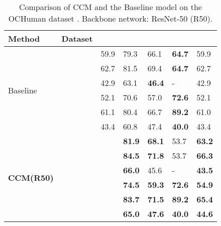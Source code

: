 \documentclass[twocolumn]{svjour3}          \smartqed  \usepackage{natbib}
\begin{document}
\begin{table}[htbp]
\centering
  \caption{Comparison of CCM and the Baseline model on the OCHuman dataset \citep{zhang2019pose}. Backbone network: ResNet-50 (R50).}
\begin{tabular}{p{1.2cm}p{1.3cm}p{1cm}<{\centering}p{0.6cm}<{\centering}p{0.6cm}<{\centering}p{0.5cm}<{\centering}p{0.5cm}<{\centering}}
    \toprule
    Method    & Dataset &     &   &   &    &  \\
    \midrule
    \multirow{6}[0]{*}{Baseline} &    & 59.9  & 79.3  & 66.1  & \textbf{64.7}  & 59.9 \\
          &  & 62.7  & 81.5  & 69.4  & \textbf{64.7}  & 62.7 \\
          &  & 42.9  & 63.1  & \textbf{46.4}  & -     & 42.9 \\
          \cmidrule{2-7}
          &   & 52.1  & 70.6  & 57.0    & \textbf{72.6}  & 52.1 \\
          &  & 61.1  & 80.4  & 66.7  & \textbf{89.2}  & 61.0 \\
          &  & 43.4  & 60.8  & 47.4  & \textbf{40.0}    & 43.4 \\
    \midrule
    \midrule
    \multirow{6}[0]{*}{\textbf{CCM(R50)}} &    &   & \textbf{81.9}  & \textbf{68.1}  & 53.7  & \textbf{63.2} \\
          &  &   & \textbf{84.5}  & \textbf{71.8}  & 53.7  & \textbf{66.3} \\
          &  &   & \textbf{66.0}    & 45.6  & -     & \textbf{43.5} \\
          \cmidrule{2-7}
          &   &   & \textbf{74.5}  & \textbf{59.3}  & \textbf{72.6}  & \textbf{54.9} \\
          &  &   & \textbf{83.7}  & \textbf{71.5}  & \textbf{89.2}  & \textbf{65.4} \\
          &  &   & \textbf{65.0}    & \textbf{47.6}  & \textbf{40.0}    & \textbf{44.6} \\
    \bottomrule
    \end{tabular}\label{tab:ochuman}\end{table}
\end{document}
